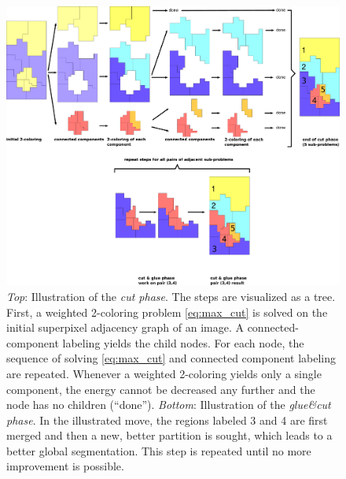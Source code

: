 \begin{figure}
\centering\includegraphics[width=\textwidth]{fig/illustration_new.pdf}
%
\caption[Illustration of cut and cut and glue phase]{\label{fig:illustration_cut}%
%
\emph{Top}:
Illustration of the \emph{cut phase}.
The steps are visualized as a
tree.
First, a weighted 2-coloring problem \eqref{eq:max_cut}
is solved on the initial
superpixel adjacency graph of an image. A connected-component labeling
yields the child nodes. For each node, the sequence of solving \eqref{eq:max_cut} 
and connected component labeling are repeated. Whenever a weighted 2-coloring
yields only a single component, the energy cannot be decreased any further and the
node has no children (``done'').
%
\emph{Bottom}:
Illustration of the \emph{glue\&cut phase}. In the illustrated move,
the regions labeled 3 and 4 are first merged and then a new, better 
partition is sought, which leads to a better global segmentation. This step
is repeated until no more improvement is possible.
}
\end{figure}





